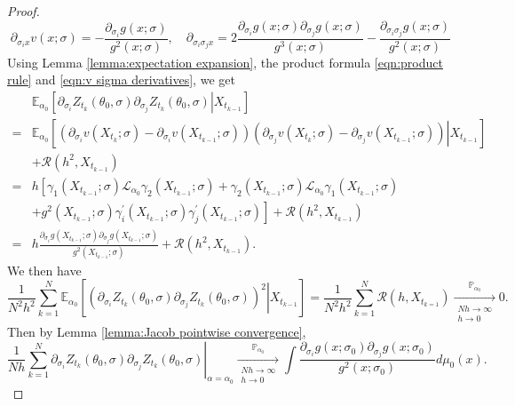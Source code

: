 \documentclass[a4paper,12pt]{article}
\numberwithin{equation}{section}
\theoremstyle{plain}
\theoremstyle{definition}
\begin{document}
\begin{appendix}
\begin{proof}
\begin{equation}\label{eqn:v sigma derivatives}
        \partial_{\sigma_i x}v(x;\sigma)=-\frac{\partial_{\sigma_i}g(x;\sigma)}{g^2(x;\sigma)},\quad \partial_{\sigma_i\sigma_jx}=2\frac{\partial_{\sigma_i}g(x;\sigma)\partial_{\sigma_j}g(x;\sigma)}{g^3(x;\sigma)}-\frac{\partial_{\sigma_i\sigma_j}g(x;\sigma)}{g^2(x;\sigma)}
    \end{equation}
   Using Lemma \ref{lemma:expectation expansion}, the product formula \eqref{eqn:product rule} and \eqref{eqn:v sigma derivatives}, we get
    \begin{align*}
        &\mathbb{E}_{\alpha_0}\left[\left.\partial_{\sigma_i}Z_{t_k}(\theta_0,\sigma)\partial_{\sigma_j}Z_{t_k}(\theta_0,\sigma)\right|X_{t_{k-1}}\right]\\
        =&\mathbb{E}_{\alpha_0}\left[\left.\left(\partial_{\sigma_i}v(X_{t_k};\sigma)-\partial_{\sigma_i}v(X_{t_{k-1}};\sigma)\right)\left(\partial_{\sigma_j}v(X_{t_k};\sigma)-\partial_{\sigma_j}v(X_{t_{k-1}};\sigma)\right)\right|X_{t_{k-1}}\right]\\
        &+\mathcal{R}(h^2,X_{t_{k-1}})\\
        =&h\left[\gamma_1(X_{t_{k-1}};\sigma)\mathcal{L}_{\alpha_0}\gamma_2(X_{t_{k-1}};\sigma)+\gamma_2(X_{t_{k-1}};\sigma)\mathcal{L}_{\alpha_0}\gamma_1(X_{t_{k-1}};\sigma)\right.\\
        &\left.+g^2(X_{t_{k-1}};\sigma)\gamma^\prime_i(X_{t_{k-1}};\sigma)\gamma^\prime_{j}(X_{t_{k-1}};\sigma)\right]+\mathcal{R}(h^2,X_{t_{k-1}})\\
        =&h\frac{\partial_{\sigma_i}g(X_{t_{k-1}};\sigma)\partial_{\sigma_j}g(X_{t_{k-1}};\sigma)}{g^2(X_{t_{k-1}};\sigma)}+\mathcal{R}(h^2,X_{t_{k-1}}).
    \end{align*}
We then have 
    \begin{equation*}
        \frac{1}{N^2h^2}\sum_{k=1}^N\mathbb{E}_{\alpha_0}\left[ \left.\left(\partial_{\sigma_i}Z_{t_k}(\theta_0,\sigma)\partial_{\sigma_j}Z_{t_k}(\theta_0,\sigma)\right)^2\right| X_{t_{k-1}}\right]=\frac{1}{N^2h^2}\sum_{k=1}^N \mathcal{R}(h,X_{t_{k=1}})\xrightarrow[\substack{N h\rightarrow\infty \\ h \rightarrow 0}]{\mathbb{P}_{\alpha_0}}0.
    \end{equation*}
    Then by Lemma \ref{lemma:Jacob pointwise convergence},
    \begin{equation}\label{eqn:Z sigma Z sigma}
        \left.\frac{1}{Nh}\sum_{k=1}^N\partial_{\sigma_i}Z_{t_{k}}(\theta_0,\sigma)\partial_{\sigma_j}Z_{t_{k}}(\theta_0,\sigma)\right|_{\alpha=\alpha_0}\xrightarrow[\substack{N h\rightarrow\infty \\ h \rightarrow 0}]{\mathbb{P}_{\alpha_0}}\int \frac{\partial_{\sigma_i}g(x;\sigma_0)\partial_{\sigma_j}g(x;\sigma_0)}{g^2(x;\sigma_0)}d\mu_0(x).

\end{equation}
\end{proof}
\end{appendix}
\end{document}

